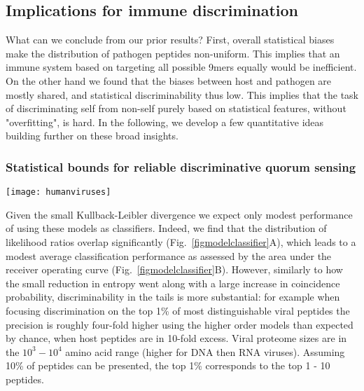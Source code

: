 \documentclass[superscriptaddress,twocolumn,pre]{revtex4}
\newcommand{\<}{\langle}
\renewcommand{\>}{\rangle}
\begin{document}
\subsection{Implications for immune discrimination}

What can we conclude from our prior results? First, overall statistical biases make the distribution of pathogen peptides non-uniform. This implies that an immune system based on targeting all possible 9mers equally would be inefficient. On the other hand we found that the biases between host and pathogen are mostly shared, and statistical discriminability thus low. This implies that the task of discriminating self from non-self purely based on statistical features, without "overfitting", is hard. In the following, we develop a few quantitative ideas building further on these broad insights.


\subsubsection{Statistical bounds for reliable discriminative quorum sensing}

\begin{figure*}
    \begin{center}
    \texttt{[image: humanviruses]}
    \end{center}
    \caption{Performance of the models as classifiers. (A) Distributions of likelihood ratios for peptides from host and virus proteins. (B) Sensitivity-specificity tradeoff curve for various models. (C) Precision-recall characteristics at a 10-fold excess of self-peptides.
    \label{figmodelclassifier}
    }
\end{figure*}

Given the small Kullback-Leibler divergence we expect only modest performance of using these models as classifiers. Indeed, we find that the distribution of likelihood ratios overlap significantly (Fig.~\ref{figmodelclassifier}A), which leads to a modest average classification performance as assessed by the area under the receiver operating curve (Fig.~\ref{figmodelclassifier}B). However, similarly to how the small reduction in entropy went along with a large increase in coincidence probability, discriminability in the tails is more substantial: for example when focusing discrimination on the top 1\% of most distinguishable viral peptides the precision is roughly four-fold higher using the higher order models than expected by chance, when host peptides are in 10-fold excess. Viral proteome sizes are in the $10^3-10^4$ amino acid range (higher for DNA then RNA viruses). Assuming 10\% of peptides can be presented, the top 1\% corresponds to the top 1 - 10 peptides.
\end{document}
